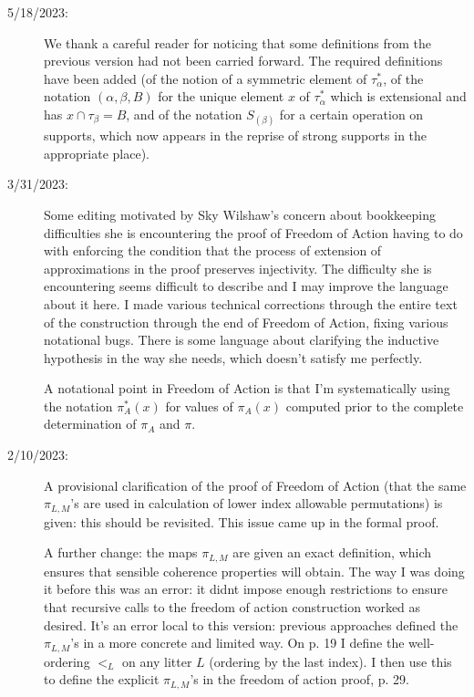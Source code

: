 \documentclass[112pt]{article}
\begin{document}
\begin{description}

\item[5/18/2023:]  We thank a careful reader for noticing that some definitions from the previous version had not been carried forward.  The required definitions have been added (of the notion of a symmetric element of $\tau^*_\alpha$, of the notation $(\alpha,\beta,B)$ for the unique element $x$ of $\tau^*_\alpha$ which is extensional and has $x \cap \tau_\beta=B$, and of the notation $S_{(\beta)}$ for a certain operation on supports, which now appears in the reprise of strong supports in the appropriate place).

\item[3/31/2023:]  Some editing motivated by Sky Wilshaw's concern about bookkeeping difficulties she is encountering the proof of Freedom of Action having to do with enforcing the condition that the process of extension of approximations in the proof preserves injectivity.   The difficulty she is encountering seems difficult to describe and I may improve the language about it here.  I made various technical corrections through the entire text of the construction through the end of Freedom of Action, fixing various notational bugs.  There is some language about clarifying the inductive hypothesis in the way she needs, which doesn't satisfy me perfectly.

A notational point in Freedom of Action is that I'm systematically using the notation $\pi^*_A(x)$ for values of $\pi_A(x)$ computed prior to the complete determination of
$\pi_A$ and $\pi$.

\item[2/10/2023:]  A provisional clarification of the proof of Freedom of Action (that the same $\pi_{L,M}$'s are used in calculation of lower index allowable permutations) is given:  this should be revisited.  This issue came up in the formal proof.

A further change:  the maps $\pi_{L,M}$ are given an exact definition, which ensures that sensible coherence properties will obtain.  The way I was doing it before this was an error:  it didnt impose enough restrictions to ensure that recursive calls to the freedom of action construction worked as desired.  It's an error local to this version:  previous approaches defined the $\pi_{L,M}$'s in a more concrete and limited way.  On p. 19 I define the well-ordering $<_L$ on any litter $L$ (ordering by the last index).  I then use this to define the explicit $\pi_{L,M}$'s in the freedom of action proof, p. 29.


\end{description}
\end{document}
